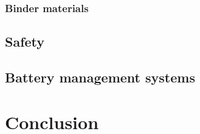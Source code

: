 \documentclass[12pt]{article} %
\begin{document}
\subsubsection{Binder materials} %


\subsection{Safety}


\subsection{Battery management systems}









\section{Conclusion} %

\lipsum[12-13]





\end{document}
